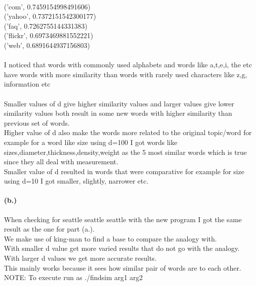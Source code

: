 \documentclass{article}
\begin{document}
\\('com', 0.7459154998491606)
\\('yahoo', 0.7372151542300177)
\\('faq', 0.7262755144331383)
\\('flickr', 0.6973469881552221)
\\('web', 0.6891644937156803)
\\\\I noticed that words with commonly used alphabets and words like a,t,e,i, the etc have words with more similarity than words with rarely used characters like z,g, information etc
\\\\Smaller values of d give higher similarity values and larger values give lower similarity values both result in some new words with higher similarity than previous set of words.
\\Higher value of d also make the words more related to the original topic/word for example for a word like size using d=100 I got words like sizes,diameter,thickness,density,weight as the 5 most similar words which is true since they all deal with measurement.
\\Smaller value of d resulted in words that were comparative for example for size using d=10 I got smaller, slightly, narrower etc.
\paragraph{(b.)}
When checking for seattle seattle seattle with the new program I got the same result as the one for part (a.).
\\We make use of king-man to find a base to compare the analogy with. 
\\With smaller d value get more varied results that do not go with the analogy. 
\\With larger d values we get more accurate results.
\\This mainly works because it sees how similar pair of words are to each other.
\\NOTE: To execute run as ./findsim arg1 arg2
\end{document}
